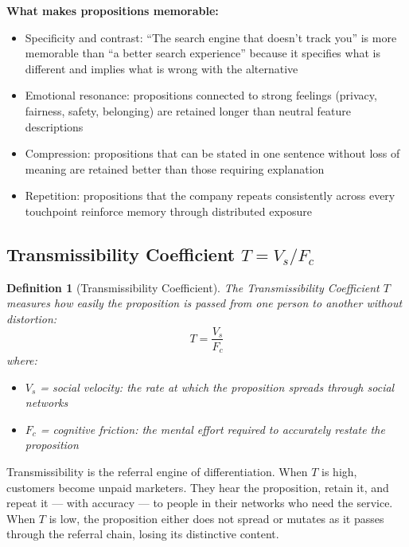\documentclass[12pt, openany]{book}
\theoremstyle{thmstyle}
\theoremstyle{defstyle}
\newtheorem{definition}{Definition}[chapter]
\begin{document}
\textbf{What makes propositions memorable:}
\begin{itemize}[leftmargin=1.5em]
  \item Specificity and contrast: ``The search engine that doesn't track you'' is more memorable than ``a better search experience'' because it specifies what is different and implies what is wrong with the alternative
  \item Emotional resonance: propositions connected to strong feelings (privacy, fairness, safety, belonging) are retained longer than neutral feature descriptions
  \item Compression: propositions that can be stated in one sentence without loss of meaning are retained better than those requiring explanation
  \item Repetition: propositions that the company repeats consistently across every touchpoint reinforce memory through distributed exposure
\end{itemize}

\subsection{Transmissibility Coefficient $T = V_s / F_c$}

\begin{definition}[Transmissibility Coefficient]
The Transmissibility Coefficient $T$ measures how easily the proposition is passed from one person to another without distortion:
\begin{equation}
T = \frac{V_s}{F_c}
\label{eq:transmissibility}
\end{equation}
where:
\begin{itemize}[leftmargin=1.5em]
  \item $V_s$ = social velocity: the rate at which the proposition spreads through social networks
  \item $F_c$ = cognitive friction: the mental effort required to accurately restate the proposition
\end{itemize}
\end{definition}

Transmissibility is the referral engine of differentiation. When $T$ is high, customers become unpaid marketers. They hear the proposition, retain it, and repeat it --- with accuracy --- to people in their networks who need the service. When $T$ is low, the proposition either does not spread or mutates as it passes through the referral chain, losing its distinctive content.
\end{document}
